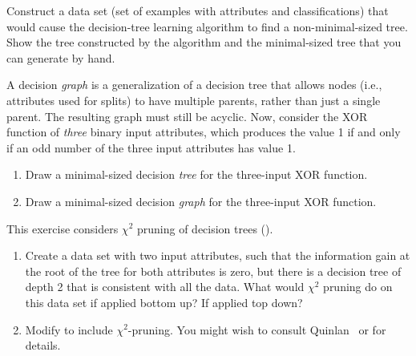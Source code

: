 \begin{iexercise}
Construct a data set (set of examples with attributes and
classifications) that would cause the decision-tree learning algorithm 
to find a non-minimal-sized tree.  Show the tree
constructed by the algorithm and the minimal-sized tree that you can
generate by hand.
\end{iexercise} 

\begin{uexercise}
A decision {\em graph} is a generalization of a decision tree that
allows nodes (i.e., attributes used for splits) to have multiple
parents, rather than just a single parent.  The resulting graph must
still be acyclic.  Now, consider the XOR function of {\em three} binary
input attributes, which produces the value 1 if and
only if an odd number of the three input attributes has value 1.
\begin{enumerate}
  \item Draw a minimal-sized decision {\em tree} for the three-input XOR function.
    \item Draw a minimal-sized decision {\em graph} for the three-input XOR function.
\end{enumerate}
\end{uexercise} 

\begin{exercise}%
This exercise considers \(\chi^2\) pruning of decision trees ().
\begin{enumerate}
\item Create a data set with two input attributes, such that the
information gain at the root of the tree for both attributes is zero,
but there is a decision tree of depth 2 that is consistent with all the data.
What would \(\chi^2\) pruning do on this data set if applied bottom up?  If applied top down?
\item Modify  to include \(\chi^2\)-pruning.  You
might wish to consult Quinlan~\citeyear{Quinlan:1986} or  for details.
\end{enumerate}
\end{exercise} 


